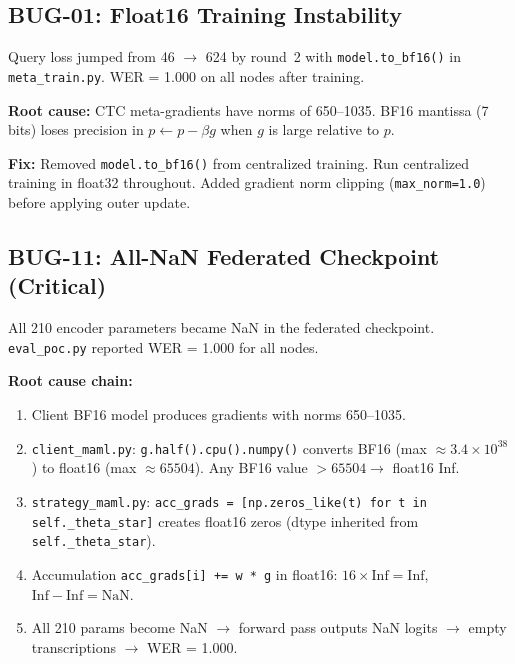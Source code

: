 \documentclass[11pt,a4paper]{article}
\theoremstyle{definition}
\begin{document}
\subsection{BUG-01: Float16 Training Instability}

\begin{warningbox}[Symptom]
Query loss jumped from 46 $\to$ 624 by round~2 with \texttt{model.to\_bf16()} in
\texttt{meta\_train.py}.  WER = 1.000 on all nodes after training.
\end{warningbox}

\textbf{Root cause:} CTC meta-gradients have norms of 650--1035.  BF16 mantissa
(7 bits) loses precision in $p \leftarrow p - \beta g$ when $g$ is large relative
to $p$.

\textbf{Fix:} Removed \texttt{model.to\_bf16()} from centralized training.  Run
centralized training in float32 throughout.  Added gradient norm clipping
(\texttt{max\_norm=1.0}) before applying outer update.

\subsection{BUG-11: All-NaN Federated Checkpoint (Critical)}

\begin{warningbox}[Symptom]
All 210 encoder parameters became NaN in the federated checkpoint.
\texttt{eval\_poc.py} reported WER = 1.000 for all nodes.
\end{warningbox}

\textbf{Root cause chain:}

\begin{enumerate}[leftmargin=*]
  \item Client BF16 model produces gradients with norms 650--1035.
  \item \texttt{client\_maml.py}: \texttt{g.half().cpu().numpy()} converts BF16
        (max $\approx 3.4 \times 10^{38}$) to float16 (max $\approx 65504$).  Any
        BF16 value $> 65504 \to$ float16 Inf.
  \item \texttt{strategy\_maml.py}: \texttt{acc\_grads = [np.zeros\_like(t) for t
        in self.\_theta\_star]} creates float16 zeros (dtype inherited from
        \texttt{self.\_theta\_star}).
  \item Accumulation \texttt{acc\_grads[i] += w * g} in float16: $16 \times
        \text{Inf} = \text{Inf}$, $\text{Inf} - \text{Inf} = \text{NaN}$.
  \item All 210 params become NaN $\to$ forward pass outputs NaN logits $\to$
        empty transcriptions $\to$ WER = 1.000.
\end{enumerate}
\end{document}
